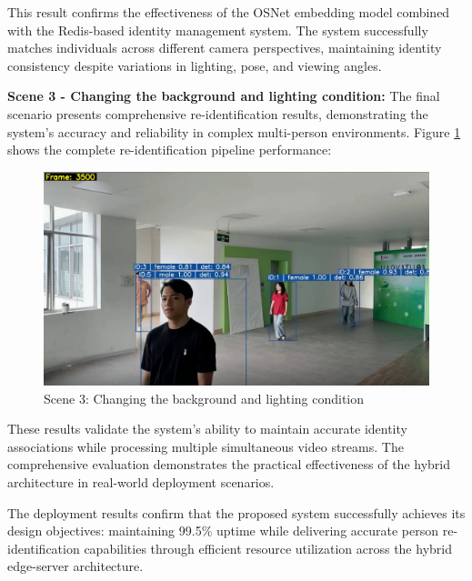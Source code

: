 This result confirms the effectiveness of the OSNet embedding model combined with the Redis-based identity management system. The system successfully matches individuals across different camera perspectives, maintaining identity consistency despite variations in lighting, pose, and viewing angles.

\textbf{Scene 3 - Changing the background and lighting condition:}
The final scenario presents comprehensive re-identification results, demonstrating the system's accuracy and reliability in complex multi-person environments. Figure \ref{fig:scene3_results} shows the complete re-identification pipeline performance:

\begin{figure}[htbp]
    \centering
    \includegraphics[width=1\textwidth]{Figure/s3.png}
    \caption{Scene 3: Changing the background and lighting condition}
    \label{fig:scene3_results}
\end{figure}

These results validate the system's ability to maintain accurate identity associations while processing multiple simultaneous video streams. The comprehensive evaluation demonstrates the practical effectiveness of the hybrid architecture in real-world deployment scenarios.

The deployment results confirm that the proposed system successfully achieves its design objectives: maintaining 99.5\% uptime while delivering accurate person re-identification capabilities through efficient resource utilization across the hybrid edge-server architecture.



